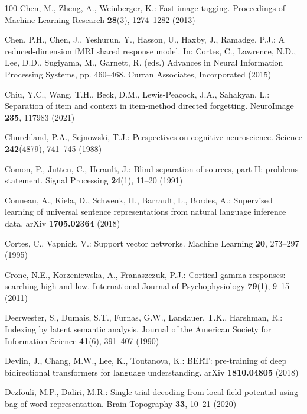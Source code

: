 \documentclass{llmxive}
\begin{document}
\begin{thebibliography}{100}
Chen, M., Zheng, A., Weinberger, K.: Fast image tagging. Proceedings of Machine
  Learning Research  \textbf{28}(3),  1274--1282 (2013)

Chen, P.H., Chen, J., Yeshurun, Y., Hasson, U., Haxby, J., Ramadge, P.J.: A
  reduced-dimension {fMRI} shared response model. In: Cortes, C., Lawrence,
  N.D., Lee, D.D., Sugiyama, M., Garnett, R. (eds.) Advances in Neural
  Information Processing Systems, pp. 460--468. Curran Associates, Incorporated
  (2015)

Chiu, Y.C., Wang, T.H., Beck, D.M., Lewis-Peacock, J.A., Sahakyan, L.:
  Separation of item and context in item-method directed forgetting.
  {NeuroImage}  \textbf{235},  117983 (2021)

Churchland, P.A., Sejnowski, T.J.: Perspectives on cognitive neuroscience.
  Science  \textbf{242}(4879),  741--745 (1988)

Comon, P., Jutten, C., Herault, J.: Blind separation of sources, part {II}:
  problems statement. Signal Processing  \textbf{24}(1),  11--20 (1991)

Conneau, A., Kiela, D., Schwenk, H., Barrault, L., Bordes, A.: Supervised
  learning of universal sentence representations from natural language
  inference data. {arXiv}  \textbf{1705.02364} (2018)

Cortes, C., Vapnick, V.: Support vector networks. Machine Learning
  \textbf{20},  273--297 (1995)

Crone, N.E., Korzeniewska, A., Franaszczuk, P.J.: Cortical gamma responses:
  searching high and low. International Journal of Psychophysiology
  \textbf{79}(1),  9--15 (2011)

Deerwester, S., Dumais, S.T., Furnas, G.W., Landauer, T.K., Harshman, R.:
  Indexing by latent semantic analysis. Journal of the {American} Society for
  Information Science  \textbf{41}(6),  391--407 (1990)

Devlin, J., Chang, M.W., Lee, K., Toutanova, K.: {BERT}: pre-training of deep
  bidirectional transformers for language understanding. {arXiv}
  \textbf{1810.04805} (2018)

Dezfouli, M.P., Daliri, M.R.: Single-trial decoding from local field potential
  using bag of word representation. Brain Topography  \textbf{33},  10--21
  (2020)


\end{thebibliography}
\end{document}
